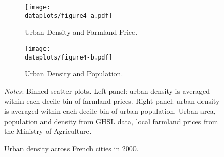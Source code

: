 \documentclass[./20250130-paper.tex]{subfiles}
\begin{document}















\begin{figure}[h!]
	\begin{subfigure}{0.5\textwidth}
		\texttt{[image: \\dataplots/figure4-a.pdf]}
		\caption{Urban Density and Farmland Price.\label{fig:cross-section-density-price}}
	\end{subfigure}%
	\hspace{5mm}
	\begin{subfigure}{0.5\textwidth}
		\texttt{[image: \\dataplots/figure4-b.pdf]}
		\caption{Urban Density and Population.\label{fig:cross-section-density-pop}}
	\end{subfigure}
	\caption{Urban density across French cities in 2000.}
	{\footnotesize \textit{Notes}: Binned scatter plots. Left-panel: urban density is averaged within each decile bin of farmland prices. Right panel: urban density is averaged within each decile bin of urban population. Urban area, population and density from GHSL data, local farmland prices from the Ministry of Agriculture.}
\end{figure}
\end{document}
